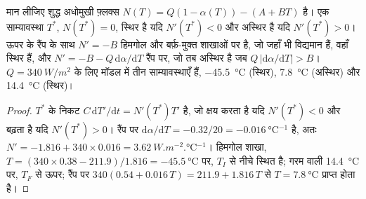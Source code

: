 \begin{proposition}[तीन साम्यावस्थाएँ और उनकी स्थिरता]\label{prop:b3:climate-models:three}
मान लीजिए शुद्ध अधोमुखी फ़्लक्स $N(T) = Q(1 - \alpha(T)) - (A + BT)$ है। एक
साम्यावस्था $T^*$, $N(T^*) = 0$, स्थिर है यदि $N'(T^*) < 0$ और
अस्थिर है यदि $N'(T^*) > 0$। ऊपर के रैंप के साथ $N' = -B$ हिमगोल और बर्फ़-मुक्त शाखाओं पर है,
जो जहाँ भी विद्यमान हैं, वहाँ स्थिर हैं, और $N' = -B -
Q\,\mathrm d\alpha/\mathrm dT$ रैंप पर, जो तब अस्थिर है जब $Q\,
|\mathrm d\alpha/\mathrm dT| > B$। $Q = \qty{340}{W/m^2}$ के लिए मॉडल में
तीन साम्यावस्थाएँ हैं, \qty{-45.5}{\celsius} (स्थिर), \qty{7.8}{\celsius}
(अस्थिर) और \qty{14.4}{\celsius} (स्थिर)।
\end{proposition}

\begin{proof}
$T^*$ के निकट $C\,\mathrm dT'/\mathrm dt = N'(T^*)T'$ है, जो क्षय करता है यदि
$N'(T^*) < 0$ और बढ़ता है यदि $N'(T^*) > 0$। रैंप पर $\mathrm d\alpha/
\mathrm dT = -0.32/20 = \qty{-0.016}{\celsius^{-1}}$ है, अतः $N' = -1.816 + 340
\times 0.016 = \qty{+3.62}{W.m^{-2}.\celsius^{-1}}$। हिमगोल शाखा,
$T = (340\times0.38 - 211.9)/1.816 = \qty{-45.5}{\celsius}$ पर, $T_I$ से नीचे स्थित है;
गरम वाली \qty{14.4}{\celsius} पर, $T_F$ से ऊपर; रैंप पर
$340(0.54 + 0.016\,T) = 211.9 + 1.816\,T$ से $T = \qty{7.8}{\celsius}$ प्राप्त होता है।
\end{proof}

